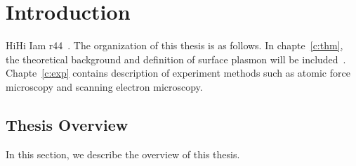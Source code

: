 \chapter{Introduction}
\label{c:intro}

HiHi Iam r44~. The organization of this thesis is as follows. In chapte~\ref{c:thm}, the theoretical background and definition of surface plasmon will be included~\cite{maier2007plasmonics}. Chapte~\ref{c:exp} contains description of experiment methods such as atomic force microscopy and scanning electron microscopy. 






\section{Thesis Overview}
\label{s:ThesisOverview}
In this section, we describe the overview of this thesis.

%
%